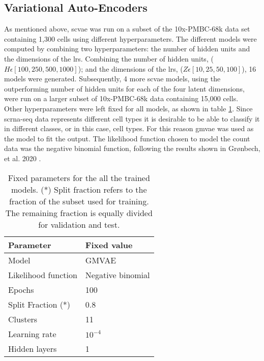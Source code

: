 \documentclass{article}
\begin{document}
\subsection{Variational Auto-Encoders}
\label{sec:vae}

\noindent As mentioned above, \gls{scvae} was run on a subset of the 10x-PMBC-68k data set containing 1,300 cells using different hyperparameters. %
The different models were computed by combining two hyperparameters: the number of hidden units and the dimensions of the \glspl{lr}. 
Combining the number of hidden units, ($H\epsilon[100, 250, 500, 1000]$); and the dimensions of the \glspl{lr}, ($Z\epsilon[10, 25, 50, 100]$), 16 models were generated.
Subsequently, 4 more \gls{scvae} models, using the outperforming number of hidden units for each of the four latent dimensions, were run on a larger subset of 10x-PMBC-68k data containing 15,000 cells. \\

\noindent Other hyperparameters were left fixed for all models, as shown in table \ref{tab:scvae_fixed}. 
Since \gls{scrna-seq} data represents different cell types it is desirable to be able to classify it in different classes, or in this case, cell types. 
For this reason \gls{gmvae} was used as the model to fit the output. 
The likelihood function chosen to model the count data was the negative binomial function, following the results shown in Grønbech, et al. 2020 \cite{gronbech2020}.\\



\begin{table}[htp]
\caption{\small{Fixed parameters for the all the trained models. (*) Split fraction refers to the fraction of the subset used for training. The remaining fraction is equally divided for validation and test. }}
\vspace{0.25cm}
\small
\centering
\begin{tabular}{ll}
    \hline
    Parameter & Fixed value \\
    \hline
    Model & GMVAE  \\
    Likelihood function & Negative binomial \\
    Epochs & 100 \\
    Split Fraction (*) & 0.8 \\
    Clusters & 11 \\
    Learning rate & $10^{-4}$ \\
    Hidden layers & 1 \\
    \hline
\end{tabular}
\label{tab:scvae_fixed}
\end{table}
\end{document}
